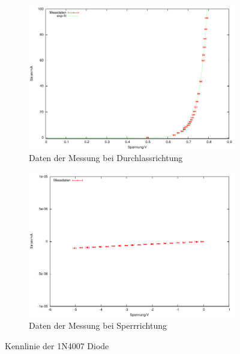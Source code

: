 \documentclass[12pt,a4paper]{article}
\begin{document}
\begin{figure}[H]
        \centering
        \begin{subfigure}[b]{0.48\textwidth}
                \includegraphics[width=\textwidth , scale = 0.4]{a1_1.pdf}
                \caption[Daten der Messung bei Durchlassrichtung]{Daten der Messung bei Durchlassrichtung}
 				 \label{fig:a1_1}
        \end{subfigure}%
        \hfill
        \begin{subfigure}[b]{0.48\textwidth}
                \includegraphics[width=\textwidth , scale = 0.4]{a1_2.pdf}
                \caption[Daten der Messung bei Sperrrichtung]{Daten der Messung bei Sperrrichtung}
  				\label{fig:a1_2}
        \end{subfigure}
        \caption{Kennlinie der 1N4007 Diode}
        \label{fig:a1}
\end{figure}
\end{document}

